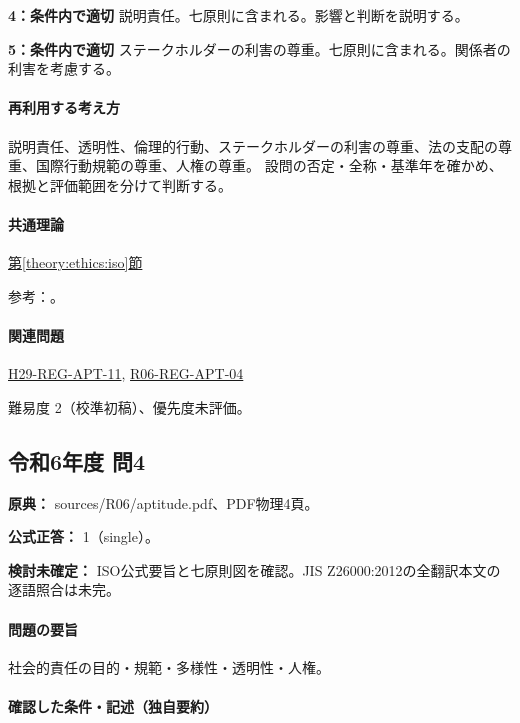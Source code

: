 \noindent\textbf{4：条件内で適切} 説明責任。七原則に含まれる。影響と判断を説明する。\par

\noindent\textbf{5：条件内で適切} ステークホルダーの利害の尊重。七原則に含まれる。関係者の利害を考慮する。\par

\paragraph{再利用する考え方} 説明責任、透明性、倫理的行動、ステークホルダーの利害の尊重、法の支配の尊重、国際行動規範の尊重、人権の尊重。 設問の否定・全称・基準年を確かめ、根拠と評価範囲を分けて判断する。

\paragraph{共通理論} \hyperref[theory:ethics:iso]{第\ref*{theory:ethics:iso}節}

\par 参考：\cite{eth54_iso_brochure}。

\paragraph{関連問題} \hyperref[q:h29-reg-apt-11]{H29-REG-APT-11}, \hyperref[q:r06-reg-apt-04]{R06-REG-APT-04}

\par 難易度 2（校準初稿）、優先度未評価。

\subsection{令和6年度 問4}
\label{q:r06-reg-apt-04}

\noindent\textbf{原典：} sources/R06/aptitude.pdf、PDF物理4頁。

\textbf{公式正答：} 1（single）。

\par\textbf{検討未確定：} ISO公式要旨と七原則図を確認。JIS Z26000:2012の全翻訳本文の逐語照合は未完。

\paragraph{問題の要旨} 社会的責任の目的・規範・多様性・透明性・人権。

\paragraph{確認した条件・記述（独自要約）}\mbox{}\par

